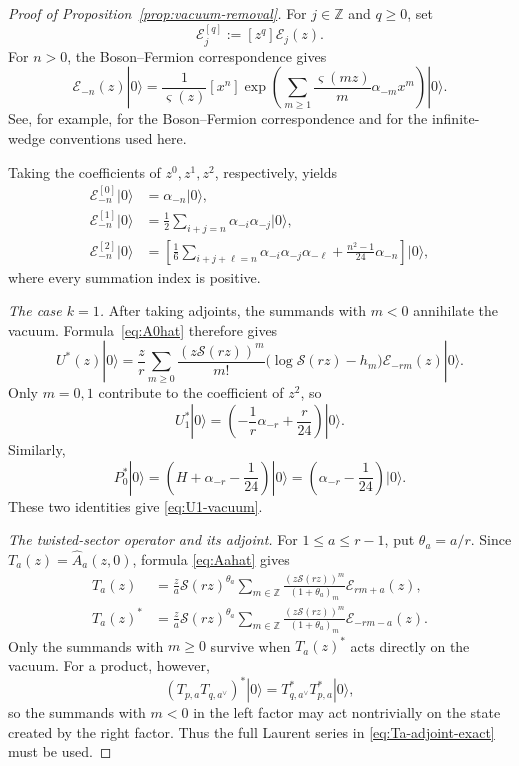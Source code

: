 \documentclass[letterpaper,12pt]{amsart}
\theoremstyle{definition}
\newcommand{\Scal}{\mathcal S}
\newcommand{\Ecal}{\mathcal E}
\newcommand{\vars}{\varsigma}
\newcommand{\vac}{|0\rangle}
\numberwithin{equation}{section}
\begin{document}
\begin{proof}[Proof of Proposition~\ref{prop:vacuum-removal}]
For \(j\in\mathbb Z\) and \(q\geq0\), set
\[
  \Ecal_j^{[q]}:=[z^q]\Ecal_j(z).
\]
For \(n>0\), the Boson--Fermion correspondence gives
\[
  \Ecal_{-n}(z)\vac
  =
  \frac1{\vars(z)}[x^n]
  \exp\left(
    \sum_{m\geq1}\frac{\vars(mz)}m\alpha_{-m}x^m
  \right)\vac.
\]
See, for example, \cite[Chapter~14]{Kac90} for the Boson--Fermion correspondence and \cite[Appendix~A]{Oko01} for the infinite-wedge conventions used here.

Taking the coefficients of \(z^0,z^1,z^2\), respectively, yields
\begin{align}
  \Ecal_{-n}^{[0]}\vac
  &=
  \alpha_{-n}\vac,
  \label{eq:E0exp}\\
  \Ecal_{-n}^{[1]}\vac
  &=
  \frac12\sum_{i+j=n}\alpha_{-i}\alpha_{-j}\vac,
  \label{eq:E1exp}\\
  \Ecal_{-n}^{[2]}\vac
  &=
  \left[
    \frac16\sum_{i+j+\ell=n}
    \alpha_{-i}\alpha_{-j}\alpha_{-\ell}
    +
    \frac{n^2-1}{24}\alpha_{-n}
  \right]\vac,
  \label{eq:E2exp}
\end{align}
where every summation index is positive.

\smallskip
\noindent\emph{The case \(k=1\).}
After taking adjoints, the summands with \(m<0\) annihilate the vacuum.
Formula~\eqref{eq:A0hat} therefore gives
\begin{equation}\label{eq:Ustar-series}
  U^*(z)\vac
  =
  \frac zr\sum_{m\geq0}
  \frac{(z\Scal(rz))^m}{m!}
  \bigl(\log\Scal(rz)-h_m\bigr)
  \Ecal_{-rm}(z)\vac.
\end{equation}
Only \(m=0,1\) contribute to the coefficient of \(z^2\), so
\[
  U_1^*\vac
  =
  \left(-\frac1r\alpha_{-r}+\frac r{24}\right)\vac.
\]
Similarly,
\[
  P_0^*\vac
  =
  \left(H+\alpha_{-r}-\frac1{24}\right)\vac =
  \left(\alpha_{-r}-\frac1{24}\right)\vac.
\]
These two identities give \eqref{eq:U1-vacuum}.

\smallskip
\noindent\emph{The twisted-sector operator and its adjoint.}
For \(1\leq a\leq r-1\), put \(\theta_a=a/r\).  Since
\(T_a(z)=\widehat A_a(z,0)\), formula \eqref{eq:Aahat} gives
\begin{equation}\label{eq:Ta-adjoint-exact}
\begin{aligned}
  T_a(z)
  &=
  \frac za\Scal(rz)^{\theta_a}
  \sum_{m\in\mathbb Z}
  \frac{(z\Scal(rz))^m}{(1+\theta_a)_m}
  \Ecal_{rm+a}(z),\\
  T_a(z)^*
  &=
  \frac za\Scal(rz)^{\theta_a}
  \sum_{m\in\mathbb Z}
  \frac{(z\Scal(rz))^m}{(1+\theta_a)_m}
  \Ecal_{-rm-a}(z).
\end{aligned}
\end{equation}
Only the summands with \(m\geq0\) survive when \(T_a(z)^*\) acts directly
on the vacuum.  For a product, however,
\[
  (T_{p,a}T_{q,a^\vee})^*\vac
  =
  T_{q,a^\vee}^*T_{p,a}^*\vac,
\]
so the summands with \(m<0\) in the left factor may act nontrivially on
the state created by the right factor.  Thus the full Laurent series in
\eqref{eq:Ta-adjoint-exact} must be used.


\end{proof}
\end{document}
